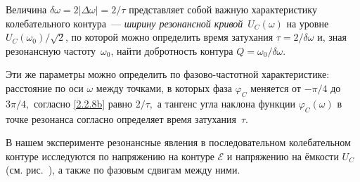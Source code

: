 Величина $\delta\omega=2|\Delta\omega|=2/\tau$ представляет собой важную
характеристику колебательного контура~--- \emph{ширину резонансной кривой}~$U_C(\omega)$
на уровне $U_C(\omega_0)/\sqrt{2}$, по которой можно определить
время затухания $\tau=2/\delta\omega$ и, зная резонансную частоту~$\omega_0$,
найти добротность контура $Q=\omega_0/\delta\omega$.

Эти же параметры можно определить по фазово-частотной характеристике: расстояние
по оси $\omega$ между точками, в которых фаза $\varphi_C$ меняется от $-\pi/4$
до $3\pi/4,$ согласно \eqref{2.2.8b} равно $2/\tau,$ а тангенс угла наклона
функции $\varphi_C(\omega)$ в точке резонанса согласно  определяет
время затухания~$\tau$.

В нашем эксперименте резонансные явления в последовательном колебательном
контуре исследуются по напряжению на контуре $\mathcal{E}$ и напряжению на
ёмкости $U_C$ (см. рис.~), а также по фазовым сдвигам между ними.

